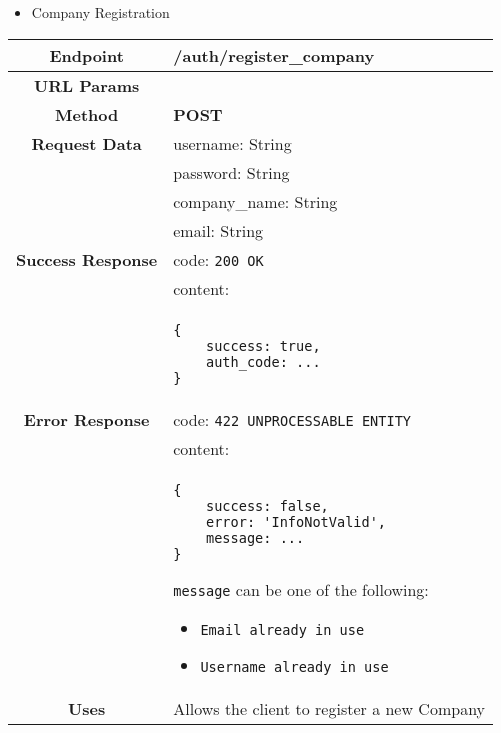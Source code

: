     \begin{itemize}
        \item Company Registration
    \end{itemize}
    \begin{adjustwidth}{1cm}{}
        \begin{longtable}{|c|l|}
            \hline
            \textbf{Endpoint} & /auth/register\_company \\
            \hline
            \textbf{URL Params} &  \\
            \hline
            \textbf{Method} & \textbf{POST} \\
            \hline
            \textbf{Request Data} & username: String \\
            &                 password: String \\
            &                 company\_name: String \\
            &                 email: String \\
            \hline
            \textbf{Success Response} & code: \texttt{200 OK} \\
            &                           content: \\
            & \begin{minipage}[t]{0.5\textwidth}
                \begin{adjustwidth}{1.5cm}{}
                \begin{verbatim}
{
    success: true, 
    auth_code: ...
}
                \end{verbatim}
                \end{adjustwidth}
              \end{minipage} \\
              \hline
            \textbf{Error Response} & code: \texttt{422 UNPROCESSABLE ENTITY} \\
            &                         content: \\
            & \begin{minipage}[t]{0.7\textwidth}
                \begin{adjustwidth}{1.5cm}{}
                \begin{verbatim}
{
    success: false, 
    error: 'InfoNotValid',
    message: ...
}
                \end{verbatim}
                \end{adjustwidth}
                \texttt{message} can be one of the following: 
                \begin{itemize}
                    \item \texttt{Email already in use}
                    \item \texttt{Username already in use}
                \end{itemize}
              \end{minipage} \\
              \hline
            \textbf{Uses} & Allows the client to register a new Company \\
            \hline
        \end{longtable}
    \end{adjustwidth}

